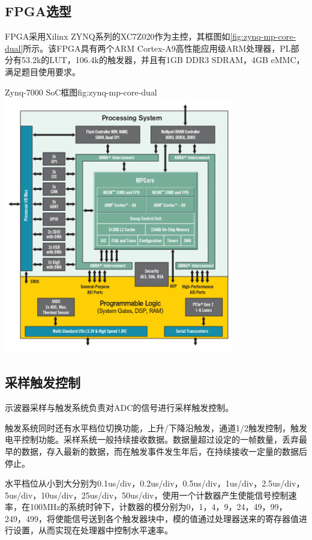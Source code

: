\documentclass[supercite]{HustGraduPaper}
\begin{document}
	\subsection{FPGA选型}
	FPGA采用Xilinx ZYNQ系列的XC7Z020作为主控，其框图如\autoref{fig:zynq-mp-core-dual}所示。该FPGA具有两个ARM Cortex-A9高性能应用级ARM处理器，PL部分有53.2k的LUT，106.4k的触发器，并且有1GB DDR3 SDRAM，4GB eMMC，满足题目使用要求。	
	
	\begin{generalfig}[htb]{Zynq-7000 SoC框图}{fig:zynq-mp-core-dual}
		\includegraphics[width=10cm]{Figures/zynq-mp-core-dual.png}
	\end{generalfig}	
	
	\subsection{采样触发控制}
	示波器采样与触发系统负责对ADC的信号进行采样触发控制。
	
	触发系统同时还有水平档位切换功能，上升/下降沿触发，通道1/2触发控制，触发电平控制功能。采样系统一般持续接收数据。数据量超过设定的一帧数量，丢弃最早的数据，存入最新的数据，而在触发事件发生年后，在持续接收一定量的数据后停止。
	
	水平档位从小到大分别为0.1us/div，0.2us/div，0.5us/div，1us/div，2.5us/div，5us/div，10us/div，25us/div，50us/div，使用一个计数器产生使能信号控制速率，在100MHz的系统时钟下，计数器的模分别为0，1，4，9，24，49，99，249，499，将使能信号送到各个触发器块中，模的值通过处理器送来的寄存器值进行设置，从而实现在处理器中控制水平速率。
	
\end{document}
